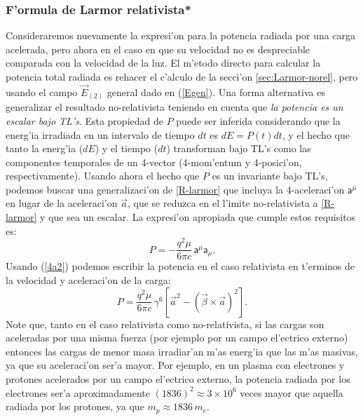 \subsubsection{F'ormula de Larmor relativista*}


Consideraremos nuevamente la expresi'on para la potencia radiada por una carga acelerada, pero ahora en el caso en que su velocidad no es despreciable comparada con la velocidad de la luz. El m'etodo directo para calcular la
potencia total radiada es rehacer el c'alculo de la secci'on \ref{sec:Larmor-norel}, pero usando el campo $\vec{E}_{(2)}$ general dado en (\ref{Egen}). Una forma alternativa es generalizar el resultado no-relativista teniendo en cuenta que \textit{la potencia es un escalar bajo TL's}. Esta propiedad de $P$ puede ser inferida considerando que la energ'ia irradiada en un intervalo de tiempo $dt$ es $dE=P(t)dt$, y el hecho que tanto la energ'ia ($dE$) y el tiempo ($dt$) transforman bajo TL's como las componentes temporales de un 4-vector (4-mom'entum y 4-posici'on, respectivamente). Usando ahora el hecho que $P$ es un invariante bajo TL's, podemos buscar una generalizaci'on de \eqref{R-larmor} que incluya la 4-aceleraci'on $\mathsf{a}^\mu$ en lugar de la aceleraci'on $\vec{a}$, que se reduzca en el l'imite no-relativista a \eqref{R-larmor} y que sea un escalar. La expresi'on apropiada que cumple estos requisitos es:
\begin{equation}
\boxed{P=-\frac{q^2\mu}{6\pi c}\,\mathsf{a}^\mu\mathsf{a}_\mu.}\label{R-larmor-rel}
\end{equation}
Usando (\ref{4a2}) podemos escribir la potencia en el caso
relativista en t'erminos de la velocidad y aceleraci'on de la carga:
\begin{equation}
\boxed{P=\frac{q^2\mu}{6\pi c}\,\gamma^6\left[ \vec{a}^2-\left(\vec{\beta}\times\vec{a}\right)^2\right] .}\label{R-larmor2}
\end{equation}
Note que, tanto en el caso relativista como no-relativista, si las cargas son
aceleradas por una misma fuerza (por ejemplo por un campo el'ectrico externo)
entonces las cargas de menor masa irradiar'an m'as energ'ia que las m'as
masivas, ya que su aceleraci'on ser'a mayor. Por ejemplo, en un plasma con
electrones y protones acelerados por un campo el'ectrico externo, la potencia
radiada por los electrones ser'a aproximadamente $(1836)^2\approx 3\times
10^{6}$ veces mayor que aquella radiada por los protones, ya que $m_p\approx
1836\,m_e$.

